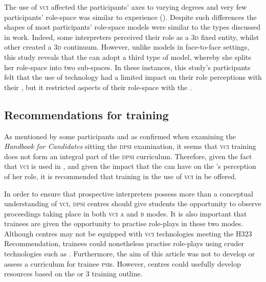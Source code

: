 \documentclass[output=paper]{langsci/langscibook}
\begin{document}
The use of \textsc{vci}  affected the participants’ axes to varying degrees and very few participants’ role-space was similar to 
  experience (). Despite such differences the shapes of most participants’ role-space models were similar to the types discussed in  work. Indeed, some interpreters perceived their role as a \textsc{3d} fixed entity, whilst other created a \textsc{3d} continuum. However, unlike  models in face-to-face settings, this study reveals that the  can adopt a third type of model, whereby she splits her role-space into two sub-spaces. In these instances, this study’s participants felt that the use of technology had a limited impact on their role perceptions with their , but it restricted aspects of their role-space with the . 

\subsection{Recommendations for training}
As mentioned by some participants and as confirmed when examining the  \textit{Handbook for Candidates} sitting the \textsc{dpsi} examination, it seems that \textsc{vci} training does not form an integral part of the \textsc{dpsi} curriculum. Therefore, given the fact that \textsc{vci} is used in , and given the impact that the  can have on the ’s perception of her role, it is recommended that training in the use of \textsc{vci} in  be offered.  

In order to ensure that prospective  interpreters possess more than a conceptual understanding of \textsc{vci}, \textsc{dpsi} centres should give students the opportunity to observe proceedings taking place in both \textsc{vci a} and \textsc{b} modes. It is also important that trainees are given the opportunity to practise role-plays in these two modes. Although centres may not be equipped with \textsc{vci} technologies meeting the  H323 Recommendation, trainees could nonetheless practise role-plays using cruder technologies such as . Furthermore, the aim of this article was not to develop or assess a curriculum for trainee \textsc{psi}s. However, centres could usefully develop resources based on the \citet{Braun2011c} or  3 training outline. 
\end{document}

